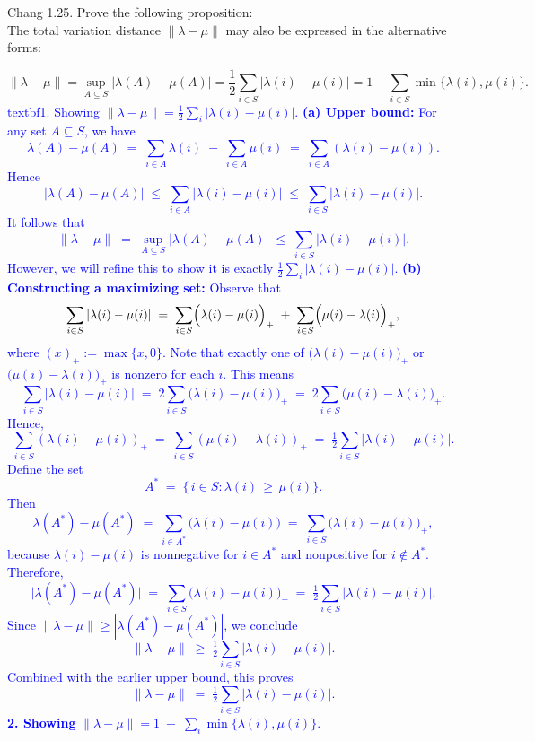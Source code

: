\documentclass{article}
\begin{document}
Chang 1.25. Prove the following proposition:  \\
The total variation distance $\|\lambda - \mu\|$ may also be expressed in the alternative forms:

\[
\|\lambda - \mu\| = \sup_{A \subseteq S} |\lambda(A) - \mu(A)| = \frac{1}{2} \sum_{i \in S} |\lambda(i) - \mu(i)| = 1 - \sum_{i \in S} \min\{\lambda(i), \mu(i)\}.
\]
\textcolor{blue}{
textbf{1. Showing} \(\displaystyle \|\lambda - \mu\| = \frac{1}{2}\sum_{i}|\lambda(i) - \mu(i)|\).
\medskip
\noindent
\textbf{(a) Upper bound:} For any set \(A \subseteq S\), we have
\[
\lambda(A) - \mu(A) 
\;=\; \sum_{i \in A} \lambda(i) \;-\; \sum_{i \in A} \mu(i)
\;=\; \sum_{i \in A} (\lambda(i) - \mu(i)).
\]
Hence
\[
|\lambda(A) - \mu(A)|
\;\le\; \sum_{i \in A} |\lambda(i) - \mu(i)|
\;\le\; \sum_{i \in S} |\lambda(i) - \mu(i)|.
\]
It follows that
\[
\|\lambda - \mu\| 
\;=\; \sup_{A \subseteq S} |\lambda(A) - \mu(A)|
\;\le\; \sum_{i \in S} |\lambda(i) - \mu(i)|.
\]
However, we will refine this to show it is exactly \(\tfrac12\sum_i|\lambda(i)-\mu(i)|\).
\medskip
\noindent
\textbf{(b) Constructing a maximizing set:} Observe that
\[
\sum_{i \in S} |\lambda(i) - \mu(i)|
\;=\; \sum_{i \in S} \Bigl(\lambda(i) - \mu(i)\Bigr)_+ 
\;+\; \sum_{i \in S} \Bigl(\mu(i) - \lambda(i)\Bigr)_+,
\]
where $(x)_+ := \max\{x,0\}$. Note that exactly one of \(\bigl(\lambda(i)-\mu(i)\bigr)_+\) or \(\bigl(\mu(i)-\lambda(i)\bigr)_+\) is nonzero for each \(i\). This means
\[
\sum_{i \in S} \bigl|\lambda(i) - \mu(i)\bigr|
\;=\; 2 \sum_{i \in S} \bigl(\lambda(i) - \mu(i)\bigr)_+ 
\;=\; 2 \sum_{i \in S} \bigl(\mu(i) - \lambda(i)\bigr)_+.
\]
Hence,
\[
\sum_{i \in S} (\lambda(i)-\mu(i))_+
\;=\;
\sum_{i \in S} (\mu(i)-\lambda(i))_+
\;=\;
\tfrac12 \sum_{i \in S} |\lambda(i) - \mu(i)|.
\]
Define the set
\[
A^* \;=\; \{\,i \in S : \lambda(i) \,\ge\, \mu(i)\}.
\]
Then
\[
\lambda(A^*) - \mu(A^*)
\;=\; \sum_{i \in A^*} \bigl(\lambda(i) - \mu(i)\bigr)
\;=\; \sum_{i \in S} \bigl(\lambda(i)-\mu(i)\bigr)_+,
\]
because \(\lambda(i)-\mu(i)\) is nonnegative for $i \in A^*$ and nonpositive for $i\notin A^*$. Therefore,
\[
\bigl|\lambda(A^*) - \mu(A^*)\bigr|
\;=\;
\sum_{i \in S} \bigl(\lambda(i)-\mu(i)\bigr)_+
\;=\;
\tfrac12 \sum_{i \in S} \bigl|\lambda(i) - \mu(i)\bigr|.
\]
Since $\|\lambda-\mu\| \ge |\lambda(A^*) - \mu(A^*)|$, we conclude
\[
\|\lambda - \mu\|
\;\ge\;
\tfrac12 \sum_{i \in S} \bigl|\lambda(i) - \mu(i)\bigr|.
\]
Combined with the earlier upper bound, this proves
\[
\|\lambda - \mu\|
\;=\;
\tfrac12 \sum_{i \in S} \bigl|\lambda(i) - \mu(i)\bigr|.
\]
\medskip
\noindent
\textbf{2. Showing} \(\displaystyle \|\lambda - \mu\| = 1 \;-\;\sum_{i} \min\{\lambda(i), \mu(i)\}\).
}
\end{document}
